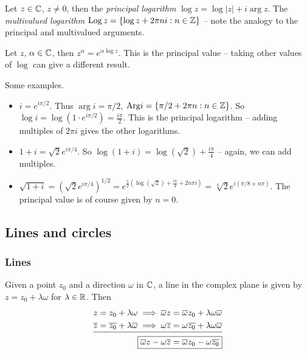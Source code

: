 \documentclass{../../template/note}
\begin{document}
    \begin{definition}
        Let \(z \in \mathbb C\), \(z \neq 0\), then the \emph{principal logarithm} \(\log z = \log|z| + i \arg{z}\). The \emph{multivalued logarithm} \(\operatorname{Log} z = \{\log z + 2\pi n i : n \in \mathbb Z\}\) -- note the analogy to the principal and multivalued arguments.
    \end{definition}
    
    \begin{definition}
        Let \(z\), \(\alpha \in \mathbb C\), then \(z^\alpha = e^{\alpha \log z}\). This is the principal value -- taking other values of \(\log\) can give a different result.
    \end{definition}
    
    \begin{example} Some examples.
        \begin{itemize}
            \item \(i = e^{i\pi/2}\). Thus \(\arg i = \pi / 2\), \(\mathrm{Arg} i = \{\pi/2 + 2\pi n : n \in \mathbb Z\}\). So \(\log i = \log (1 \cdot e^{i\pi/2}) = \frac{i\pi}{2}\). This is the principal logarithm -- adding multiples of \(2 \pi i\) gives the other logarithms.
            \item \(1 + i = \sqrt 2 e^{i \pi /4}\). So \(\log(1 + i) = \log(\sqrt 2) + \frac{i \pi}{4}\) -- again, we can add multiples.
            \item \(\sqrt{1+i} = (\sqrt 2 e^{i \pi /4})^{1/2} = e^{\frac{1}{2}\left(\log(\sqrt 2) + \frac{i \pi}{4}+2n\pi i\right)} = \sqrt[4]{2} e^{i \left(\pi/8 + n \pi\right)}\). The principal value is of course given by \(n = 0\).
        \end{itemize}
        
        
    \end{example}
    
    \subsection{Lines and circles}

    \subsubsection{Lines}

    Given a point \(z_0\) and a direction \(\omega\) in \(\mathbb C\), a line in the complex plane is given by \(z = z_0 + \lambda \omega\) for \(\lambda \in \mathbb R\). Then
    \begin{align*}
        z = z_0 + \lambda \omega \implies \overline \omega z &= \overline \omega z_0 + \lambda \omega \overline \omega \\
        \overline z = \overline{z_0} + \lambda \overline \omega \implies \omega \overline z &= \omega \overline{z_0} + \lambda \omega \overline \omega \\[-10pt]
        \cline{1-2}
        \Aboxed{\overline{\omega}z-\omega\overline{z} &= \overline{\omega}z_0-\omega\overline{z_0}}
    \end{align*}
\end{document}
